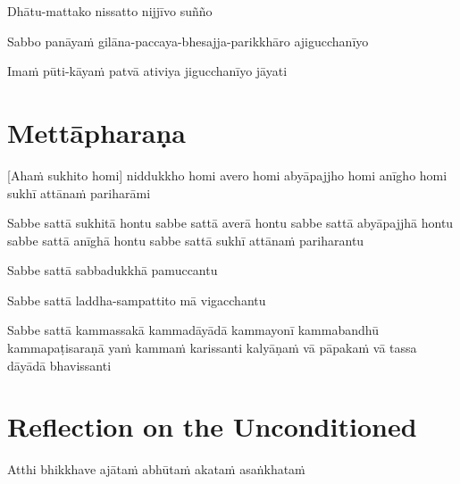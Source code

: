 
Dhātu-mattako nissatto nijjīvo suñño


Sabbo panāyaṁ gilāna-paccaya-bhesajja-parikkhāro ajigucchanīyo


Imaṁ pūti-kāyaṁ patvā ativiya jigucchanīyo jāyati


\section{Mettāpharaṇa}

\begin{leader}
\end{leader}


[Ahaṁ sukhito homi] niddukkho homi avero homi abyāpajjho homi anīgho homi
sukhī attānaṁ pariharāmi

Sabbe sattā sukhitā hontu sabbe sattā averā hontu sabbe sattā abyāpajjhā
hontu sabbe sattā anīghā hontu sabbe sattā sukhī attānaṁ pariharantu

Sabbe sattā sabbadukkhā pamuccantu

Sabbe sattā laddha-sampattito mā vigacchantu

Sabbe sattā kammassakā kammadāyādā kammayonī kammabandhū kammapaṭisaraṇā
yaṁ kammaṁ karissanti kalyāṇaṁ vā pāpakaṁ vā tassa dāyādā bhavissanti


\section[The Unconditioned]{Reflection on the Unconditioned}

\begin{leader}
\end{leader}


Atthi bhikkhave ajātaṁ abhūtaṁ akataṁ asaṅkhataṁ

